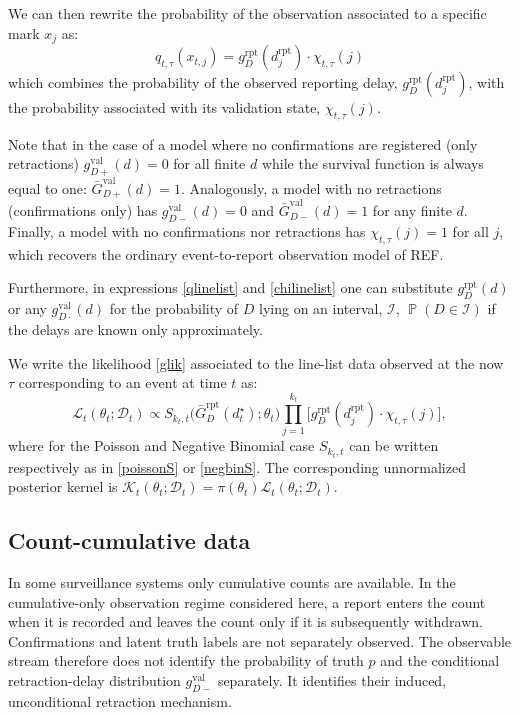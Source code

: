 \documentclass{article}
\theoremstyle{definition}
\theoremstyle{remark}
\newcommand{\Prb}{\operatorname{\mathbb{P}}}
\begin{document}
We can then rewrite the probability of the observation associated to a specific mark $x_j$ as:
\begin{equation}\label{qlinelist}
    q_{t,\tau}(x_{t,j}) = g_{D}^{\text{rpt}} (d^{\text{rpt}}_j)  \cdot \chi_{t,\tau}(j)
\end{equation}
which combines the probability of the observed reporting delay, $g_{D}^{\text{rpt}} (d^{\text{rpt}}_j)$, with the probability associated with its validation state, $\chi_{t,\tau}(j)$. 

Note that in the case of a model where no confirmations are registered (only retractions) $g_{D+}^{\text{val}}(d) = 0$ for all finite $d$ while the survival function is always equal to one: $\bar{G}_{D+}^{\text{val}}(d) = 1$. Analogously, a model with no retractions (confirmations only) has $g_{D-}^{\text{val}}(d) = 0$ and $\bar{G}_{D-}^{\text{val}}(d) = 1$ for any finite $d$. Finally, a model with no confirmations nor retractions has $\chi_{t,\tau}(j) = 1$ for all $j$, which recovers the ordinary event-to-report observation model of {\color{red} REF}. 

Furthermore, in expressions \eqref{qlinelist} and \eqref{chilinelist} one can substitute $g_{D}^{\text{rpt}}(d)$ or any $g_{D\cdot}^{\text{val}}(d)$ for the probability of $D$ lying on an interval, $\mathcal{I}$, $\Prb(D \in \mathcal{I})$ if the delays are known only approximately. 

We write the likelihood \eqref{glik} associated to the line-list data observed at the now $\tau$ corresponding to an event at time $t$ as:
\begin{equation}\label{linelist}  
    \mathcal{L}_t(\theta_t;\mathcal D_t) 
    \propto 
    S_{k_t,t}\big(\bar{G}_{D}^{\text{rpt}}(d_t^{\star});\theta_t\big) 
    \prod\limits_{j = 1}^{k_t} 
    \big[ g_{D}^{\text{rpt}} (d^{\text{rpt}}_j)  \cdot \chi_{t,\tau}(j)\big],
\end{equation}
where for the Poisson and Negative Binomial case $S_{k_t,t}$ can be written respectively as in \eqref{poissonS} or \eqref{negbinS}. The corresponding unnormalized posterior kernel is $\mathcal K_t(\theta_t;\mathcal D_t)=\pi(\theta_t)\mathcal L_t(\theta_t;\mathcal D_t)$.


\subsection{Count-cumulative data}

In some surveillance systems only cumulative counts are available. In the
cumulative-only observation regime considered here, a report enters the count
when it is recorded and leaves the count only if it is subsequently withdrawn.
Confirmations and latent truth labels are not separately observed. The
observable stream therefore does not identify the probability of truth $p$ and
the conditional retraction-delay distribution $g_{D-}^{\mathrm{val}}$
separately. It identifies their induced, unconditional retraction mechanism.
\end{document}
